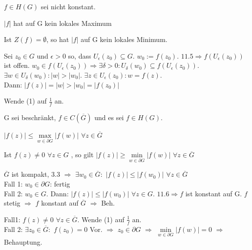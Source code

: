 \documentclass[a4paper,twoside,DIV15,BCOR12mm]{scrbook}
\begin{document}
\begin{satz} 
$f \in H(G)$ sei nicht konstant.
\begin{liste}
\item $|f|$ hat auf G kein lokales Maximum
\item Ist $Z(f) = \emptyset$, so hat $|f|$ auf G kein lokales Minimum.
\end{liste}
\end{satz}
\begin{beweis}
\begin{liste}
\item Sei $z_0 \in G$ und $\epsilon > 0$ so, dass $U_{\epsilon}(z_0) \subseteq
G.$ $ w_0 := f(z_0). $ $11.5 \Rightarrow f(U_{\epsilon}(z_0))$ ist offen. $w_0
\in f(U_{\epsilon}(z_0)) \Rightarrow \exists \delta > 0: U_{\delta}(w_0)
\subseteq f(U_{\epsilon}(z_0)).$ \\ $\exists w \in U_{\delta}(w_0) : |w| >
|w_0|.$ $
\exists z \in U_{\epsilon}(z_0): w = f(z)$.\\ Dann: $|f(z)| = |w| > |w_0| = |f(z_0)|$
\item Wende (1) auf $\frac{1}{f}$ an.
\end{liste} 
\end{beweis}
\begin{satz}
G sei beschränkt, $f \in C(\overline{G})$ und es sei $f \in H(G)$.
\begin{liste}
\item $|f(z)|  \leq \max\limits_{w \in \partial G} |f(w)| $ $\forall z \in
\overline{G}$ 
\item Ist $f(z) \neq 0$ $\forall z \in G$ , so gilt $|f(z)| \geq \min\limits_{w
\in \partial G} |f(w)|$ $\forall z \in \overline{G}$
\end{liste}
\end{satz} 
\begin{beweis}
\begin{liste}
\item $\overline{G}$ ist kompakt, 3.3 $\Rightarrow $ $\exists w_0 \in
\overline{G}:$ $|f(z)| \leq |f(w_0)|$ $\forall z \in \overline{G}$ \\
Fall 1: $w_0 \in \partial G$: fertig \\
Fall 2: $w_0 \in G.$  Dann: $|f(z)| \leq |f(w_0)|$ $\forall z \in G.$ $11.6
\Rightarrow f$ ist konstant auf G. $f$ stetig $\Rightarrow$ $f$ konstant auf
$\overline{G}$ $\Rightarrow$ Beh.
\item Fall1: $f(z) \neq 0$ $\forall z \in \overline{G}$. Wende (1) auf
$\frac{1}{f}$ an. \\
Fall 2: $\exists z_0 \in \overline{G}: $ $f(z_0) = 0$ Vor. $\Rightarrow$ $z_0
\in \partial G$ $\Rightarrow$ $\min\limits_{w\in\partial G} |f(w)| = 0$
$\Rightarrow $ Behauptung. 
\end{liste}
\end{beweis}
\end{document}
